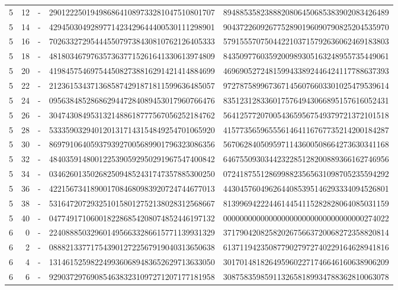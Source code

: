 \begin{longtable}{rrrll}
5 & 12 & - & 2901222501949868641089733281047510801707 & 8948853582388820806450685383902083426489 \\
5 & 14 & - & 4294503049289771423429644400530111298901 & 9043722609267752890196090790825204535970 \\
5 & 16 & - & 7026332729544455079738430810762126405333 & 5791555707504422103715792636062469183803 \\
5 & 18 & - & 4818034679763573637715261641330613974809 & 8435097760359200989305163248955735449061 \\
5 & 20 & - & 4198457546975445082738816291421414884699 & 4696905272481599433892446424117788637393 \\
5 & 22 & - & 2123615343713685874291871811599636485057 & 9727875899673671456076603301025479539614 \\
5 & 24 & - & 0956384852868629447284089453017960766476 & 8351231283360175764943066895157616052431 \\
5 & 26 & - & 3047430849531321488618777567056252184762 & 5641257720700543659567549379721372101518 \\
5 & 28 & - & 5333590329401201317143154849254701065920 & 4157735659655561464116767735214200184287 \\
5 & 30 & - & 8697910640593793927005689901796323086356 & 5670628405095971143600508664273630341168 \\
5 & 32 & - & 4840359148001225390592950291967547400842 & 6467550930344232285128200889366162746956 \\
5 & 34 & - & 0346260135026825094852431747357885300250 & 0724187551286998823565631098705235594292 \\
5 & 36 & - & 4221567341890017084680983920724744677013 & 4430457604962644085395146293334094526801 \\
5 & 38 & - & 5316472072932510158012752138028312568667 & 8139969422244614454115282828064085031159 \\
5 & 40 & - & 0477491710600182286854208074852446197132 & 0000000000000000000000000000000000274022 \\
6 & 0 & - & 2240888503296014956633286615771139931329 & 3717904208258202675663720068272358820814 \\
6 & 2 & - & 0888213377175439012722567919040313650638 & 6137119423508779027972740229164628941816 \\
6 & 4 & - & 1314615259822499360689483652629713633050 & 3017014818264959602271746646160638906209 \\
6 & 6 & - & 9290372976908546383231097271207177181958 & 3087583598591132658189934788362810063078 \\

\end{longtable}
